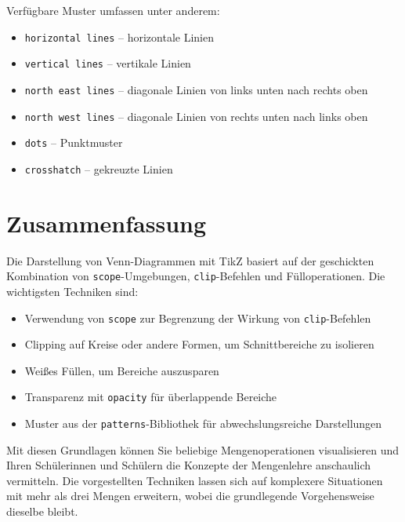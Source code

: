 Verfügbare Muster umfassen unter anderem:
\begin{itemize}
\item \texttt{horizontal lines} -- horizontale Linien
\item \texttt{vertical lines} -- vertikale Linien
\item \texttt{north east lines} -- diagonale Linien von links unten nach rechts oben
\item \texttt{north west lines} -- diagonale Linien von rechts unten nach links oben
\item \texttt{dots} -- Punktmuster
\item \texttt{crosshatch} -- gekreuzte Linien
\end{itemize}

\section{Zusammenfassung}

Die Darstellung von Venn-Diagrammen mit TikZ basiert auf der geschickten Kombination von \texttt{scope}-Umgebungen, \texttt{clip}-Befehlen und Fülloperationen. Die wichtigsten Techniken sind:

\begin{itemize}
\item Verwendung von \texttt{scope} zur Begrenzung der Wirkung von \texttt{clip}-Befehlen
\item Clipping auf Kreise oder andere Formen, um Schnittbereiche zu isolieren
\item Weißes Füllen, um Bereiche auszusparen
\item Transparenz mit \texttt{opacity} für überlappende Bereiche
\item Muster aus der \texttt{patterns}-Bibliothek für abwechslungsreiche Darstellungen
\end{itemize}

Mit diesen Grundlagen können Sie beliebige Mengenoperationen visualisieren und Ihren Schülerinnen und Schülern die Konzepte der Mengenlehre anschaulich vermitteln. Die vorgestellten Techniken lassen sich auf komplexere Situationen mit mehr als drei Mengen erweitern, wobei die grundlegende Vorgehensweise dieselbe bleibt.

